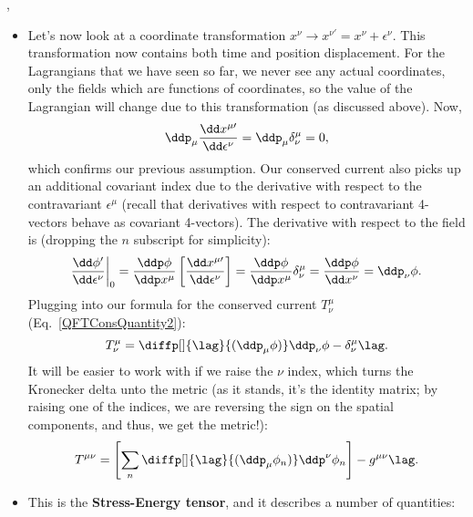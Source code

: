 \sep

\begin{itemize}
    \item Let's now look at a coordinate transformation $x^{\nu} \rightarrow x^{\nu\prime} = x^{\nu} + \epsilon^{\nu}$. This transformation now contains both time and position displacement. For the Lagrangians that we have seen so far, we never see any actual coordinates, only the fields which are functions of coordinates, so the value of the Lagrangian will change due to this transformation (as discussed above). Now,
        \begin{equation*}
            \ddp_{\mu} \frac{\dd x^{\mu\prime}}{\dd\epsilon^{\nu}} = \ddp_{\mu} \delta^{\mu}_{\nu} = 0,
        \end{equation*}
        which confirms our previous assumption. Our conserved current also picks up an additional covariant index due to the derivative with respect to the contravariant $\epsilon^{\mu}$ (recall that derivatives with respect to contravariant 4-vectors behave as covariant 4-vectors). The derivative with respect to the field is (dropping the $n$ subscript for simplicity):
        \begin{equation*}
            \frac{\dd\phi'}{\dd\epsilon^{\nu}}\bigg|_0 = \frac{\ddp\phi}{\ddp x^{\mu}} \left[\frac{\dd x^{\mu\prime}}{\dd\epsilon^{\nu}}\right] = \frac{\ddp\phi}{\ddp x^{\mu}} \delta^{\mu}_{\nu} = \frac{\ddp\phi}{\dd x^{\nu}} = \ddp_{\nu}\phi.
        \end{equation*}
        Plugging into our formula for the conserved current $T^{\mu}_{\nu}$ (Eq.~\eqref{QFTConsQuantity2}):
        \begin{equation*}
            T^{\mu}_{\nu} = \diffp[]{\lag}{(\ddp_{\mu}\phi)}\ddp_{\nu}\phi - \delta^{\mu}_{\nu}\lag.
        \end{equation*}
        It will be easier to work with if we raise the $\nu$ index, which turns the Kronecker delta unto the metric (as it stands, it's the identity matrix; by raising one of the indices, we are reversing the sign on the spatial components, and thus, we get the metric!):
        \begin{equation}
            T^{\mu\nu} = \left[\sum_n \diffp[]{\lag}{(\ddp_{\mu}\phi_n)} \ddp^{\nu}\phi_n\right] - g^{\mu\nu}\lag.\label{StressEnergyTensor}
        \end{equation}
    \item This is the \textbf{Stress-Energy tensor}, and it describes a number of quantities:
        \begin{enumerate}

\end{enumerate}
\end{itemize}
